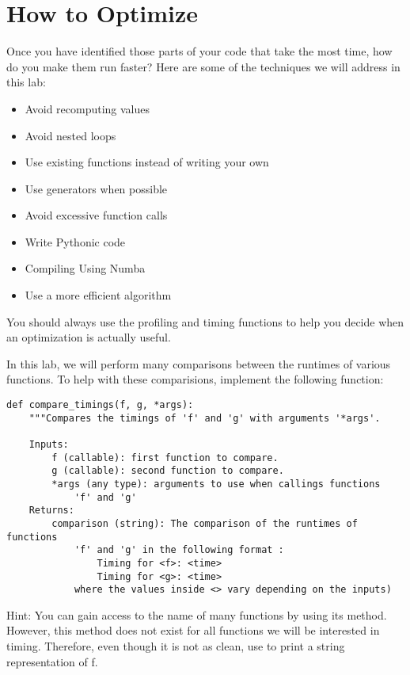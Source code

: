 \section*{How to Optimize}
Once you have identified those parts of your code that take the most time,
how do you make them run faster?
Here are some of the techniques we will address in this lab:

\begin{itemize}
\item Avoid recomputing values
\item Avoid nested loops
\item Use existing functions instead of writing your own
\item Use generators when possible
\item Avoid excessive function calls
\item Write Pythonic code
\item Compiling Using Numba
\item Use a more efficient algorithm
\end{itemize}

You should always use the profiling and timing functions to help you decide
when an optimization is actually useful.

\begin{problem}
In this lab, we will perform many comparisons between the runtimes of various
functions. To help with these comparisions, implement the following function:

\begin{lstlisting}
def compare_timings(f, g, *args):
    """Compares the timings of 'f' and 'g' with arguments '*args'.

    Inputs:
        f (callable): first function to compare.
        g (callable): second function to compare.
        *args (any type): arguments to use when callings functions
            'f' and 'g'
    Returns:
        comparison (string): The comparison of the runtimes of functions
            'f' and 'g' in the following format :
                Timing for <f>: <time>
                Timing for <g>: <time>
            where the values inside <> vary depending on the inputs)
\end{lstlisting}
Hint: You can gain access to the name of many functions by using its
 method. However, this method does not exist for all functions
we will be interested in timing. Therefore, even though it is not as clean, use
 to print a string representation of f.
\end{problem}

